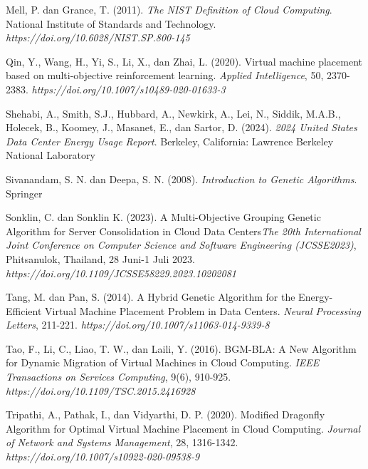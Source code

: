 \begin{thebibliography}{99}
	

	Mell, P. dan Grance, T. (2011). \textit{The NIST Definition of Cloud Computing}. National Institute of Standards and Technology. \textit{https://doi.org/10.6028/NIST.SP.800-145} 
	
	

	Qin, Y., Wang, H., Yi, S., Li, X., dan Zhai, L. (2020). Virtual machine placement based on multi-objective reinforcement learning. \textit{Applied Intelligence}, 50, 2370-2383. \textit{https://doi.org/10.1007/s10489-020-01633-3} 
	
	

	Shehabi, A., Smith, S.J., Hubbard, A., Newkirk, A., Lei, N., Siddik, M.A.B., Holecek, B., Koomey,
	J., Masanet, E., dan Sartor, D. (2024). \textit{2024 United States Data Center Energy Usage Report}. Berkeley, California: Lawrence Berkeley National Laboratory
	
	

	Sivanandam, S. N. dan Deepa, S. N. (2008). \textit{Introduction to Genetic Algorithms}. Springer 
	
	

	Sonklin, C. dan Sonklin K. (2023). A Multi-Objective Grouping Genetic Algorithm for Server Consolidation in Cloud Data Centers\textit{The 20th International Joint Conference on Computer Science and Software Engineering (JCSSE2023)}, Phitsanulok, Thailand, 28 Juni-1 Juli 2023. \textit{https://doi.org/10.1109/JCSSE58229.2023.10202081}
	
	

	Tang, M. dan Pan, S. (2014). A Hybrid Genetic Algorithm for the Energy-Efficient Virtual Machine Placement Problem in Data Centers. \textit{Neural Processing Letters}, 211-221. \textit{https://doi.org/10.1007/s11063-014-9339-8}
	
	

	Tao, F., Li, C., Liao, T. W., dan Laili, Y. (2016). BGM-BLA: A New Algorithm for Dynamic Migration of Virtual Machines in Cloud Computing. \textit{IEEE Transactions on Services Computing}, 9(6), 910-925. \textit{https://doi.org/10.1109/TSC.2015.2416928}

	

	Tripathi, A., Pathak, I., dan Vidyarthi, D. P. (2020). Modified Dragonfly Algorithm for Optimal Virtual Machine Placement in Cloud Computing. \textit{Journal of Network and Systems Management}, 28, 1316-1342. \textit{https://doi.org/10.1007/s10922-020-09538-9}
	

\end{thebibliography}
